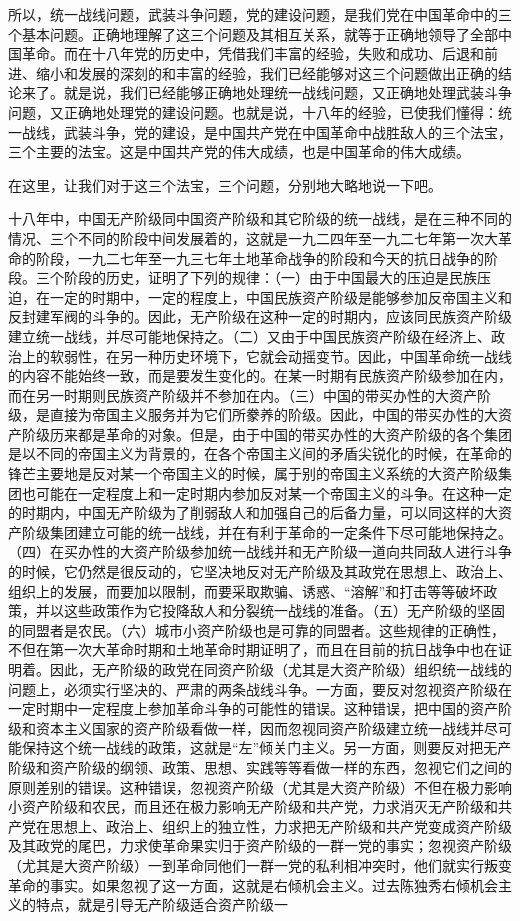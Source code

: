 所以，统一战线问题，武装斗争问题，党的建设问题，是我们党在中国革命中的三个基本问题。正确地理解了这三个问题及其相互关系，就等于正确地领导了全部中国革命。而在十八年党的历史中，凭借我们丰富的经验，失败和成功、后退和前进、缩小和发展的深刻的和丰富的经验，我们已经能够对这三个问题做出正确的结论来了。就是说，我们已经能够正确地处理统一战线问题，又正确地处理武装斗争问题，又正确地处理党的建设问题。也就是说，十八年的经验，已使我们懂得：统一战线，武装斗争，党的建设，是中国共产党在中国革命中战胜敌人的三个法宝，三个主要的法宝。这是中国共产党的伟大成绩，也是中国革命的伟大成绩。

在这里，让我们对于这三个法宝，三个问题，分别地大略地说一下吧。

十八年中，中国无产阶级同中国资产阶级和其它阶级的统一战线，是在三种不同的情况、三个不同的阶段中间发展着的，这就是一九二四年至一九二七年第一次大革命的阶段，一九二七年至一九三七年土地革命战争的阶段和今天的抗日战争的阶段。三个阶段的历史，证明了下列的规律：（一）由于中国最大的压迫是民族压迫，在一定的时期中，一定的程度上，中国民族资产阶级是能够参加反帝国主义和反封建军阀的斗争的。因此，无产阶级在这种一定的时期内，应该同民族资产阶级建立统一战线，并尽可能地保持之。（二）又由于中国民族资产阶级在经济上、政治上的软弱性，在另一种历史环境下，它就会动摇变节。因此，中国革命统一战线的内容不能始终一致，而是要发生变化的。在某一时期有民族资产阶级参加在内，而在另一时期则民族资产阶级并不参加在内。（三）中国的带买办性的大资产阶级，是直接为帝国主义服务并为它们所豢养的阶级。因此，中国的带买办性的大资产阶级历来都是革命的对象。但是，由于中国的带买办性的大资产阶级的各个集团是以不同的帝国主义为背景的，在各个帝国主义间的矛盾尖锐化的时候，在革命的锋芒主要地是反对某一个帝国主义的时候，属于别的帝国主义系统的大资产阶级集团也可能在一定程度上和一定时期内参加反对某一个帝国主义的斗争。在这种一定的时期内，中国无产阶级为了削弱敌人和加强自己的后备力量，可以同这样的大资产阶级集团建立可能的统一战线，并在有利于革命的一定条件下尽可能地保持之。（四）在买办性的大资产阶级参加统一战线并和无产阶级一道向共同敌人进行斗争的时候，它仍然是很反动的，它坚决地反对无产阶级及其政党在思想上、政治上、组织上的发展，而要加以限制，而要采取欺骗、诱惑、“溶解”和打击等等破坏政策，并以这些政策作为它投降敌人和分裂统一战线的准备。（五）无产阶级的坚固的同盟者是农民。（六）城市小资产阶级也是可靠的同盟者。这些规律的正确性，不但在第一次大革命时期和土地革命时期证明了，而且在目前的抗日战争中也在证明着。因此，无产阶级的政党在同资产阶级（尤其是大资产阶级）组织统一战线的问题上，必须实行坚决的、严肃的两条战线斗争。一方面，要反对忽视资产阶级在一定时期中一定程度上参加革命斗争的可能性的错误。这种错误，把中国的资产阶级和资本主义国家的资产阶级看做一样，因而忽视同资产阶级建立统一战线并尽可能保持这个统一战线的政策，这就是“左”倾关门主义。另一方面，则要反对把无产阶级和资产阶级的纲领、政策、思想、实践等等看做一样的东西，忽视它们之间的原则差别的错误。这种错误，忽视资产阶级（尤其是大资产阶级）不但在极力影响小资产阶级和农民，而且还在极力影响无产阶级和共产党，力求消灭无产阶级和共产党在思想上、政治上、组织上的独立性，力求把无产阶级和共产党变成资产阶级及其政党的尾巴，力求使革命果实归于资产阶级的一群一党的事实；忽视资产阶级（尤其是大资产阶级）一到革命同他们一群一党的私利相冲突时，他们就实行叛变革命的事实。如果忽视了这一方面，这就是右倾机会主义。过去陈独秀右倾机会主义的特点，就是引导无产阶级适合资产阶级一